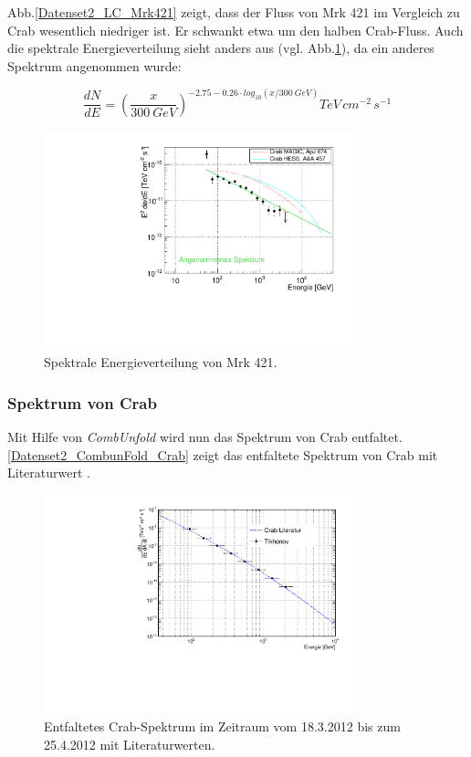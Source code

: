 Abb.\ref{Datenset2_LC_Mrk421} zeigt, dass der Fluss von Mrk 421 im Vergleich zu Crab wesentlich niedriger ist.
Er schwankt etwa um den halben Crab-Fluss.
Auch die spektrale Energieverteilung sieht anders aus (vgl. Abb.\ref{Datenset2_SED_Mrk421}), da ein anderes Spektrum angenommen wurde:

\begin{equation}
\frac{dN}{dE}=\left(\frac{x}{\SI{300}{GeV}}\right)^{-2.75-0.26 \cdot log_{10}(x/\SI{300}{GeV})}\si{TeV\,cm^{-2}\,s^{-1}}
\end{equation}


\begin{figure}
    \centering
    \includegraphics[width=0.8\textwidth]{./Plots/04_MrkAnalyse/Datenset2/SED_Mrk421.pdf}
    \caption{Spektrale Energieverteilung von Mrk 421.}
    \label{Datenset2_SED_Mrk421}
\end{figure}


\subsubsection{Spektrum von Crab}
Mit Hilfe von \textit{CombUnfold} wird nun das Spektrum von Crab entfaltet.
\autoref{Datenset2_CombunFold_Crab} zeigt das entfaltete Spektrum von Crab mit Literaturwert .

\begin{figure}
    \centering
    \includegraphics[width=0.8\textwidth]{./Plots/04_MrkAnalyse/Datenset2/Crab_mit_Literatur.pdf}
    \caption{Entfaltetes Crab-Spektrum im Zeitraum vom 18.3.2012 bis zum 25.4.2012 mit Literaturwerten.}
    \label{Datenset2_CombunFold_Crab}
\end{figure}

